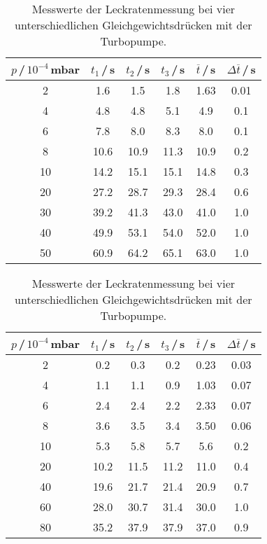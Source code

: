 \begin{table}[H]
  \caption{Messwerte der Leckratenmessung bei vier unterschiedlichen Gleichgewichtsdrücken mit der Turbopumpe.}
  \begin{subtable}{0.49\textwidth}
    \hspace{-1.5cm}
    \begin{tabular}{c|c|c|c|c|c}\label{tab:Leck5Turbo}
      $p$\,/\,$10^{-4}$\,mbar & $t_1$\,/\,s & $t_2$\,/\,s & $t_3$\,/\,s & $\overline{t}$\,/\,s & $\Delta\overline{t}$\,/\,s \\
      \midrule
      2  & 1.6  & 1.5  & 1.8  & 1.63 & 0.01 \\
      4  & 4.8  & 4.8  & 5.1  & 4.9  & 0.1  \\
      6  & 7.8  & 8.0  & 8.3  & 8.0  & 0.1  \\
      8  & 10.6 & 10.9 & 11.3 & 10.9 & 0.2  \\
      10 & 14.2 & 15.1 & 15.1 & 14.8 & 0.3  \\
      20 & 27.2 & 28.7 & 29.3 & 28.4 & 0.6  \\
      30 & 39.2 & 41.3 & 43.0 & 41.0 & 1.0  \\
      40 & 49.9 & 53.1 & 54.0 & 52.0 & 1.0  \\
      50 & 60.9 & 64.2 & 65.1 & 63.0 & 1.0  \\
    \end{tabular}
  \end{subtable}\hspace{2cm}
  \begin{subtable}{0.49\textwidth}
    \hspace{-1.5cm}
    \begin{tabular}{c|c|c|c|c|c}\label{tab:Leck10Turbo}
      $p$\,/\,$10^{-4}$\,mbar & $t_1$\,/\,s & $t_2$\,/\,s &   $t_3$\,/\,s & $\overline{t}$\,/\,s & $\Delta\overline{t}$\,/\,s \\
      \midrule
      2  & 0.2  & 0.3  & 0.2  & 0.23 & 0.03 \\
      4  & 1.1  & 1.1  & 0.9  & 1.03 & 0.07 \\
      6  & 2.4  & 2.4  & 2.2  & 2.33 & 0.07 \\
      8  & 3.6  & 3.5  & 3.4  & 3.50 & 0.06 \\
      10 & 5.3  & 5.8  & 5.7  & 5.6  & 0.2  \\
      20 & 10.2 & 11.5 & 11.2 & 11.0 & 0.4  \\
      40 & 19.6 & 21.7 & 21.4 & 20.9 & 0.7  \\
      60 & 28.0 & 30.7 & 31.4 & 30.0 & 1.0  \\
      80 & 35.2 & 37.9 & 37.9 & 37.0 & 0.9  \\
    \end{tabular}
  \end{subtable}


\end{table}
